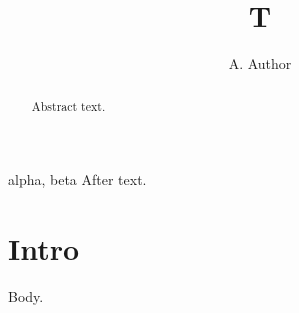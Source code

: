 \documentclass{kwpaper}
\begin{document}
\title{T}\author{A. Author}
\maketitle
\begin{abstract}
Abstract text.
\end{abstract}
\keywords alpha, beta \endkeywords
After text.
\section{Intro}
Body.
\end{document}
